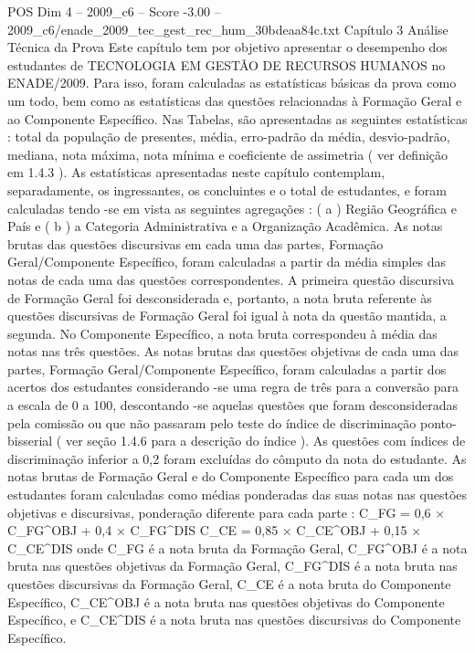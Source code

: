 \begin{textsample}{POS Dim 4 – 2009\_c6 – Score -3.00 – 2009\_c6/enade\_2009\_tec\_gest\_rec\_hum\_30bdeaa84c.txt}  \label{ex:f4_pos_321}
Capítulo 3 Análise Técnica da Prova Este capítulo tem por objetivo apresentar o desempenho dos estudantes de TECNOLOGIA EM GESTÃO DE RECURSOS HUMANOS no ENADE/2009.
Para isso, foram calculadas as estatísticas básicas da prova como um todo, bem como as estatísticas das questões relacionadas à Formação Geral e ao Componente Específico.
Nas Tabelas, são apresentadas as seguintes estatísticas : total da população de presentes, média, erro-padrão da média, desvio-padrão, mediana, nota máxima, nota mínima e coeficiente de assimetria ( ver definição em 1.4.3 ).
As estatísticas apresentadas neste capítulo contemplam, separadamente, os ingressantes, os concluintes e o total de estudantes, e foram calculadas tendo -se em vista as seguintes agregações : ( a ) Região Geográfica e País e ( b ) a Categoria Administrativa e a Organização Acadêmica.
As notas brutas das questões discursivas em cada uma das partes, Formação Geral/Componente Específico, foram calculadas a partir da média simples das notas de cada uma das questões correspondentes.
A primeira questão discursiva de Formação Geral foi desconsiderada e, portanto, a nota bruta referente às questões discursivas de Formação Geral foi igual à nota da questão mantida, a segunda.
No Componente Específico, a nota bruta correspondeu à média das notas nas três questões.
As notas brutas das questões objetivas de cada uma das partes, Formação Geral/Componente Específico, foram calculadas a partir dos acertos dos estudantes considerando -se uma regra de três para a conversão para a escala de 0 a 100, descontando -se aquelas questões que foram desconsideradas pela comissão ou que não passaram pelo teste do índice de discriminação ponto-bisserial ( ver seção 1.4.6 para a descrição do índice ).
As questões com índices de discriminação inferior a 0,2 foram excluídas do cômputo da nota do estudante.
As notas brutas de Formação Geral e do Componente Específico para cada um dos estudantes foram calculadas como médias ponderadas das suas notas nas questões objetivas e discursivas, ponderação diferente para cada parte : C\_FG = 0,6 × C\_FG\textasciicircum{}OBJ + 0,4 × C\_FG\textasciicircum{}DIS C\_CE = 0,85 × C\_CE\textasciicircum{}OBJ + 0,15 × C\_CE\textasciicircum{}DIS onde C\_FG é a nota bruta da Formação Geral, C\_FG\textasciicircum{}OBJ é a nota bruta nas questões objetivas da Formação Geral, C\_FG\textasciicircum{}DIS é a nota bruta nas questões discursivas da Formação Geral, C\_CE é a nota bruta do Componente Específico, C\_CE\textasciicircum{}OBJ é a nota bruta nas questões objetivas do Componente Específico, e C\_CE\textasciicircum{}DIS é a nota bruta nas questões discursivas do Componente Específico.

\end{textsample}

